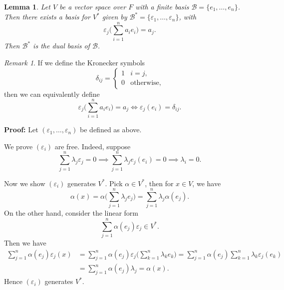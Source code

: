 \documentclass[12pt]{article}
\newtheorem{lemma}{Lemma}[section]
\theoremstyle{definition}
\theoremstyle{remark}
\newtheorem*{remark}{Remark}
\begin{document}
\begin{lemma}
	Let $V$ be a vector space over $F$ with a finite basis $\mathcal{B} = \{e_1, \ldots, e_n\}$. Then there exists a basis for $V^{\ast}$ given by $\mathcal{B}^{\ast} = \{\varepsilon_1, \ldots, \varepsilon_n\}$, with
	\[
		\varepsilon_j \Biggl( \sum_{i = 1}^{n} a_i e_i \Biggr) = a_j
	.\]
	Then $\mathcal{B}^{\ast}$ is the dual basis of $\mathcal{B}$.
\end{lemma}

\begin{remark}
	If we define the Kronecker symbols
	\[
	\delta_{ij} =
	\begin{cases}
		1 & i = j, \\
		0 & \text{otherwise},
	\end{cases}
	\]
	then we can equivalently define
	\[
		\varepsilon_j \Biggl( \sum_{i = 1}^{n} a_i e_i \Biggr) = a_j \iff \varepsilon_j(e_i) = \delta_{ij}
	.\]
\end{remark}

\begin{adjustbox}{minipage = \columnwidth - 25.5pt, margin=1em, frame=1pt, margin=0em}
	\textbf{Proof:} Let $(\varepsilon_1, \ldots, \varepsilon_n)$ be defined as above.

	We prove $(\varepsilon_i)$ are free. Indeed, suppose
	\[
		\sum_{j = 1}^{n} \lambda_j \varepsilon_j = 0 \implies \sum_{j = 1}^{n} \lambda_j e_j(e_i) = 0 \implies \lambda_i = 0
	.\]
\end{adjustbox}

\begin{adjustbox}{minipage = \columnwidth - 25.5pt, margin=1em, frame=1pt, margin=0em}
	Now we show $(\varepsilon_i)$ generates $V^{\ast}$. Pick $\alpha \in V^{\ast}$, then for $x \in V$, we have
	\[
		\alpha(x) = \alpha \Biggl( \sum_{j = 1}^{n} \lambda_j e_j \Biggr) = \sum_{j = 1}^{n} \lambda_j \alpha(e_j)
	.\]
	On the other hand, consider the linear form
	\[
		\sum_{j = 1}^{n} \alpha(e_j) \varepsilon_j \in V^{\ast}
	.\]
	Then we have
	\begin{align*}
		\sum_{j = 1}^{n} \alpha(e_j) \varepsilon_j(x) &= \sum_{j = 1}^{n} \alpha(e_j) \varepsilon_j\Biggl( \sum_{k = 1}^{n} \lambda_k e_k \Biggr) = \sum_{j = 1}^{n} \alpha(e_j) \sum_{k = 1}^{n} \lambda_k \varepsilon_j (e_k) \\
							      &= \sum_{j = 1}^{n} \alpha(e_j) \lambda_j = \alpha(x).
	\end{align*}
	Hence $(\varepsilon_i)$ generates $V^{\ast}$.
\end{adjustbox}
\end{document}
